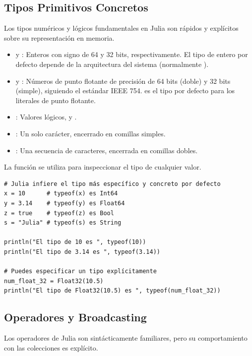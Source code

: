 \subsection*{Tipos Primitivos Concretos}
Los tipos numéricos y lógicos fundamentales en Julia son rápidos y explícitos sobre su representación en memoria.
\begin{itemize}
    \item \textbf{} y \textbf{}: Enteros con signo de 64 y 32 bits, respectivamente. El tipo de entero por defecto depende de la arquitectura del sistema (normalmente ).
    \item \textbf{} y \textbf{}: Números de punto flotante de precisión de 64 bits (doble) y 32 bits (simple), siguiendo el estándar IEEE 754.  es el tipo por defecto para los literales de punto flotante.
    \item \textbf{}: Valores lógicos,  y .
    \item \textbf{}: Un solo carácter, encerrado en comillas simples.
    \item \textbf{}: Una secuencia de caracteres, encerrada en comillas dobles.
\end{itemize}

\begin{example}
La función  se utiliza para inspeccionar el tipo de cualquier valor.
\text{ }\begin{verbatim}
# Julia infiere el tipo más específico y concreto por defecto
x = 10      # typeof(x) es Int64
y = 3.14    # typeof(y) es Float64
z = true    # typeof(z) es Bool
s = "Julia" # typeof(s) es String

println("El tipo de 10 es ", typeof(10))
println("El tipo de 3.14 es ", typeof(3.14))

# Puedes especificar un tipo explícitamente
num_float_32 = Float32(10.5)
println("El tipo de Float32(10.5) es ", typeof(num_float_32))
\end{verbatim}
\end{example}

\subsection*{Operadores y Broadcasting}
Los operadores de Julia son sintácticamente familiares, pero su comportamiento con las colecciones es explícito.

